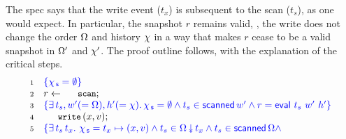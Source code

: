 The spec says that the write event ($t_x$) is subsequent to the scan
($t_s$), as one would expect. In particular, the snapshot $r$ remains
valid, \ie, the write does not change the order $\Omega$ and
history $\chi$ in a way that makes $r$ cease to be a valid snapshot
in $\Omega'$ and $\chi'$. The proof outline follows, with the
explanation of the critical steps.
%
{\small
\[
\!\begin{array}{r l}
 \num{1} & \specK{\{ \histS = \hempty \}}\\ %
 \num{2} & r \tbnd \esc{scan};\\
 \num{3} & \specK{\{ \exists\, t_s, w'(=\stableorder), h'(=\hist)\ldot 
       \histS = \hempty \wedge 
        t_s \in \scanned{w'}  \wedge r = \eval\ t_s\ w'\ h'\}}\\
 \num{4} & \esc{write}\, (x,v);\\
 \num{5} & \specK{\{ \exists\, t_s\, t_x\ldot\,
               \histS = t_x \hpts (x, v) \wedge t_s \in \sideal{\stableorder}{t_x} \wedge t_s \in \scanned{\stableorder} \wedge
}
\end{array}\]}
